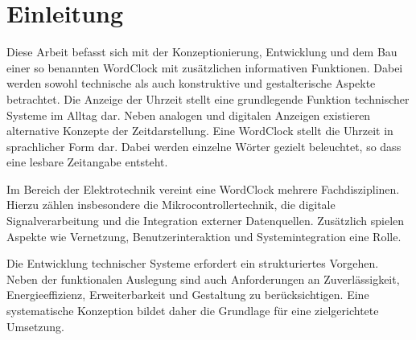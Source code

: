 \chapter{Einleitung}
Diese Arbeit befasst sich mit der Konzeptionierung, Entwicklung und dem Bau einer so benannten WordClock mit zusätzlichen informativen Funktionen. 
Dabei werden sowohl technische als auch konstruktive und gestalterische Aspekte betrachtet. 
Die Anzeige der Uhrzeit stellt eine grundlegende Funktion technischer Systeme im Alltag dar. 
Neben analogen und digitalen Anzeigen existieren alternative Konzepte der Zeitdarstellung. 
Eine WordClock stellt die Uhrzeit in sprachlicher Form dar. 
Dabei werden einzelne Wörter gezielt beleuchtet, so dass eine lesbare Zeitangabe entsteht. 

Im Bereich der Elektrotechnik vereint eine WordClock mehrere Fachdisziplinen. 
Hierzu zählen insbesondere die Mikrocontrollertechnik, die digitale Signalverarbeitung und die Integration externer Datenquellen. 
Zusätzlich spielen Aspekte wie Vernetzung, Benutzerinteraktion und Systemintegration eine Rolle. 

Die Entwicklung technischer Systeme erfordert ein strukturiertes Vorgehen. 
Neben der funktionalen Auslegung sind auch Anforderungen an Zuverlässigkeit, Energieeffizienz, Erweiterbarkeit und Gestaltung zu berücksichtigen. 
Eine systematische Konzeption bildet daher die Grundlage für eine zielgerichtete Umsetzung.